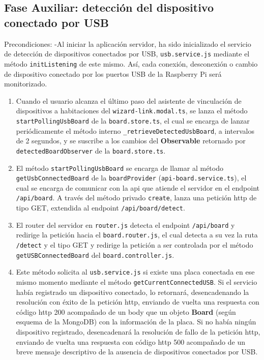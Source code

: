 \subsection{Fase Auxiliar: detección del dispositivo conectado por USB}
\label{ch:Capitulo5.2.4}
Precondiciones:
    -Al iniciar la aplicación servidor, ha sido inicializado el servicio de detección de dispositivos conectados por USB, \verb|usb.service.js| mediante el método \verb|initListening| de este mismo. Así, cada conexión, desconexión o cambio de dispositivo conectado por los puertos USB de la Raspberry Pi será monitorizado.

\begin{enumerate}
\item  Cuando el usuario alcanza el último paso del asistente de vinculación de dispositivos a habitaciones del \verb|wizard-link.modal.ts|, se lanza el método \verb|startPollingUsbBoard| de la \verb|board.store.ts|, el cual se encarga de lanzar periódicamente el método interno \verb|_retrieveDetectedUsbBoard|, a intervalos de 2 segundos, y se suscribe a los cambios del \textbf{Observable} retornado por \verb|detectedBoardObserver| de la \verb|board.store.ts|. 

\item  El método \verb|startPollingUsbBoard| se encarga de llamar al método \verb|getUsbConnectedBoard| de la \verb|boardProvider| (\verb|api-board.service.ts|), el cual se encarga de comunicar con la api que atiende el servidor en el endpoint \verb|/api/board|. A través del método privado \verb|create|, lanza una petición http de tipo GET, extendida al endpoint \verb|/api/board/detect|. 

\item  El router del servidor en \verb|router.js| detecta el endpoint \verb|/api/board| y redirige la petición hacia el \verb|board.router.js|, el cual detecta a su vez la ruta \verb|/detect| y el tipo GET y redirige la petición a ser controlada por el método \verb|getUSBConnectedBoard| del \verb|board.controller.js|.

\item  Este método solicita al \verb|usb.service.js| si existe una placa conectada en ese mismo momento mediante el método \verb|getCurrentConnectedUSB|. Si el servicio había registrado un dispositivo conectado, lo retornará, desencadenando la resolución con éxito de la petición http, enviando de vuelta una respuesta con código http 200 acompañado de un body que un objeto \textbf{Board} (según esquema de la MongoDB) con la información de la placa. Si no había ningún dispositivo registrado, desencadenará la resolución de fallo de la petición http, enviando de vuelta una respuesta con código http 500 acompañado de un breve mensaje descriptivo de la ausencia de dispositivos conectados por USB.


\end{enumerate}
